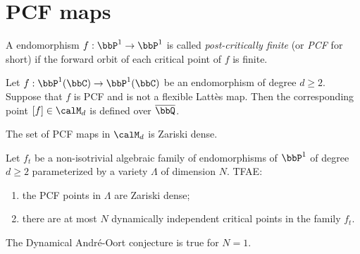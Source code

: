 \section{PCF maps}

\begin{definition}
	A endomorphism $f: \bbP^1 \to \bbP^1$ is called \emph{post-critically finite} (or \emph{PCF} for short) if the forward orbit of each critical point of $f$ is finite.
\end{definition}

%

\begin{theorem}
	Let $f: \bbP^1(\bbC) \to \bbP^1(\bbC)$ be an endomorphism of degree $d \geq 2$.
	Suppose that $f$ is PCF and is not a flexible Latt\`es map.
	Then the corresponding point $[f] \in \calM_d$ is defined over $\overline{\bbQ}$.
\end{theorem}


\begin{theorem}
	The set of PCF maps in $\calM_d$ is Zariski dense.
\end{theorem}


\begin{conjecture}
	Let $f_t$ be a non-isotrivial algebraic family of endomorphisms of $\bbP^1$ of degree $d \geq 2$ parameterized by a variety $\Lambda$ of dimension $N$.
	TFAE:
	\begin{enumerate}
		\item the PCF points in $\Lambda$ are Zariski dense;
		\item there are at most $N$ dynamically independent critical points in the family $f_t$.
	\end{enumerate}
\end{conjecture}

\begin{definition}

\end{definition}



\begin{theorem}
	The Dynamical Andr\'e-Oort conjecture is true for $N = 1$.
\end{theorem}











